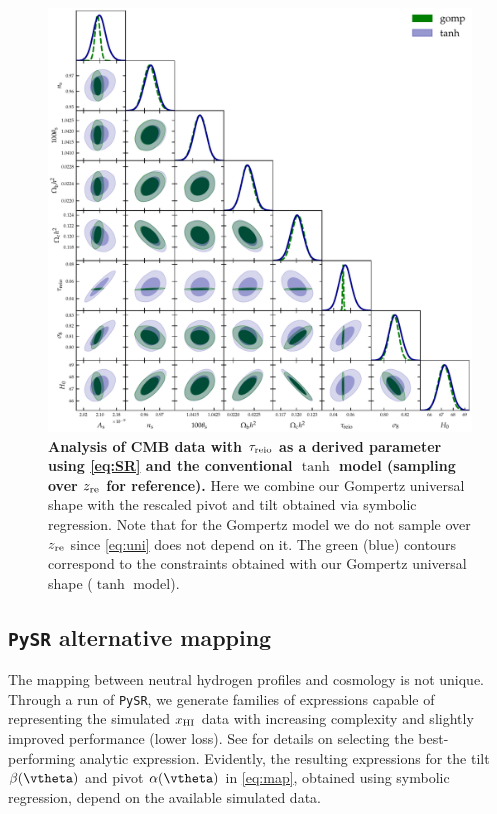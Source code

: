 \begin{figure}[tb]
\centering
\includegraphics[width=\linewidth]{figs/gomp_tanh_triangle_kill_full.pdf}
\caption{\textbf{Analysis of CMB data with $\tau_{\mathrm{reio}}$ as a derived parameter using \cref{eq:SR} and the conventional $\tanh$ model (sampling over $z_{\rm re}$ for reference). } Here we combine our Gompertz universal shape with the rescaled pivot and tilt obtained via symbolic regression. Note that for the Gompertz model we do not sample over $z_{\rm re}$ since \cref{eq:uni} does not depend on it. The green (blue) contours correspond to the constraints obtained with
our Gompertz universal shape ($\tanh$ model).}
\label{fig:unleashed_gomp}
\end{figure}


\subsection*{\texttt{PySR} alternative mapping}
\label{ssec:0226}

The mapping between neutral hydrogen profiles and cosmology is not
unique.
Through a run of \texttt{PySR}, we generate families of expressions
capable of representing the simulated $x_{\mathrm{HI}}$ data with increasing
complexity and slightly improved performance (lower loss).
See  for details on selecting the best-performing
analytic expression.
Evidently, the resulting expressions for the tilt $\tilt(\vtheta)$ and
pivot $\ap(\vtheta)$ in \cref{eq:map}, obtained using symbolic
regression, depend on the available simulated data.


